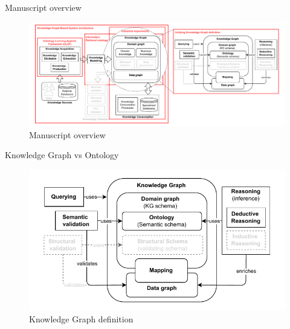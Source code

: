 \begin{frame}{Manuscript overview}
    \begin{figure} [H]
        \begin{center}
            \includegraphics[scale=0.4]{images/KGBS-detailed-technos-KG-def-conclusion-simplified.pdf} 
            \caption{Manuscript overview} 
        \end{center}
    \end{figure}
\end{frame}

\begin{frame}{Knowledge Graph vs Ontology}

    \begin{figure} [H]
        \begin{center}
            \includegraphics[scale=0.8]{images/kg-def-simple.pdf} 
            \caption{Knowledge Graph definition} 
        \end{center}
    \end{figure}

\end{frame}


